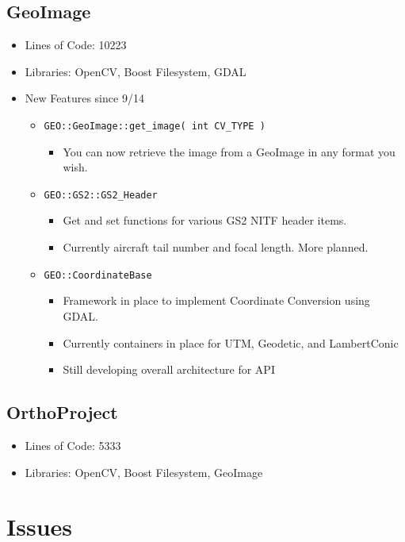 \documentclass[12pt]{report}
\begin{document}
\subsection*{GeoImage}
\begin{itemize}
\item Lines of Code: 10223
\item Libraries: OpenCV, Boost Filesystem, GDAL
\item New Features since 9/14
    \begin{itemize}
    \item \texttt{GEO::GeoImage::get\_image( int CV\_TYPE )}
        \begin{itemize}
        \item You can now retrieve the image from a GeoImage in any format you wish.
        \end{itemize}

    \item \texttt{GEO::GS2::GS2\_Header}
        \begin{itemize}
        \item Get and set functions for various GS2 NITF header items.
        \item Currently aircraft tail number and focal length. More planned.
        \end{itemize}
    \item \texttt{GEO::CoordinateBase}
        \begin{itemize}
        \item Framework in place to implement Coordinate Conversion using GDAL.
        \item Currently containers in place for UTM, Geodetic, and LambertConic
        \item Still developing overall architecture for API
        \end{itemize}
    \end{itemize}
\end{itemize}

\subsection*{OrthoProject}
\begin{itemize}
\item Lines of Code: 5333
\item Libraries: OpenCV, Boost Filesystem, GeoImage
\end{itemize}

\section*{Issues}
\end{document}

